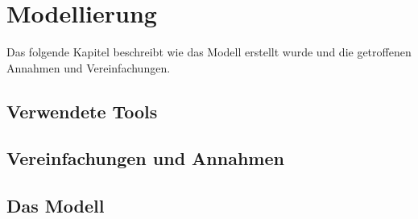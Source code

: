 \chapter{Modellierung}
Das folgende Kapitel beschreibt wie das Modell erstellt wurde und die getroffenen Annahmen und Vereinfachungen.

\section{Verwendete Tools}

\section{Vereinfachungen und Annahmen}

\section{Das Modell}